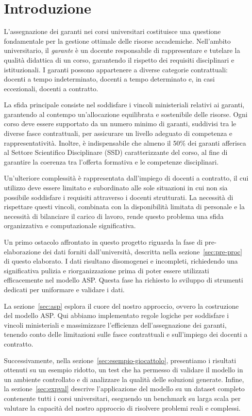 \section{Introduzione}
\label{sec:introduction}

L'assegnazione dei garanti nei corsi universitari costituisce una 
questione fondamentale per la gestione ottimale delle risorse accademiche. 
Nell'ambito universitario, il \textit{garante} è un docente responsabile 
di rappresentare e tutelare la qualità didattica di un corso, garantendo 
il rispetto dei requisiti disciplinari e istituzionali. I garanti possono 
appartenere a diverse categorie contrattuali: docenti a tempo indeterminato, 
docenti a tempo determinato e, in casi eccezionali, docenti a contratto.

La sfida principale consiste nel soddisfare i vincoli ministeriali 
relativi ai garanti, garantendo al contempo un'allocazione equilibrata 
e sostenibile delle risorse. Ogni corso deve essere supportato da un 
numero minimo di garanti, suddivisi tra le diverse fasce contrattuali, 
per assicurare un livello adeguato di competenza e rappresentatività. 
Inoltre, è indispensabile che almeno il 50\% dei garanti afferisca al 
Settore Scientifico Disciplinare (SSD) caratterizzante del corso, al 
fine di garantire la coerenza tra l'offerta formativa e le competenze 
disciplinari.

Un'ulteriore complessità è rappresentata dall'impiego di docenti a 
contratto, il cui utilizzo deve essere limitato e subordinato alle 
sole situazioni in cui non sia possibile soddisfare i requisiti 
attraverso i docenti strutturati. La necessità di rispettare questi 
vincoli, combinata con la disponibilità limitata di personale e la 
necessità di bilanciare il carico di lavoro, rende questo problema 
una sfida organizzativa e computazionale significativa.

Un primo ostacolo affrontato in questo progetto riguarda la fase di 
pre-elaborazione dei dati forniti dall'università, descritta nella 
sezione~\ref{sec:pre-proc} di questo elaborato. I dati risultano 
disomogenei e incompleti, richiedendo una significativa pulizia e 
riorganizzazione prima di poter essere utilizzati efficacemente nel 
modello ASP. Questa fase ha richiesto lo sviluppo di strumenti 
dedicati per uniformare e validare i dati.

La sezione~\ref{sec:asp} esplora il cuore del nostro approccio, 
ovvero la costruzione del modello ASP. Qui abbiamo implementato 
regole logiche per soddisfare i vincoli ministeriali e massimizzare 
l'efficienza dell'assegnazione dei garanti, tenendo conto delle 
limitazioni sulle fasce contrattuali e sull'impiego dei docenti a contratto.

Successivamente, nella sezione~\ref{sec:esempio-giocattolo}, presentiamo 
i risultati ottenuti su un esempio ridotto, un test che ha permesso 
di validare il modello in un ambiente controllato e di analizzare la qualità 
delle soluzioni generate. Infine, la sezione~\ref{sec:expval} descrive 
l'applicazione del modello su un dataset completo contenente tutti i corsi 
universitari, eseguendo un benchmark su larga scala per valutare la 
capacità del nostro approccio di risolvere problemi reali e complessi.